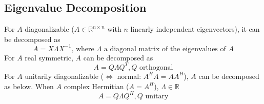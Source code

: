 \documentclass{article}
\begin{document}
\subsection{Eigenvalue Decomposition}
For $A$ diagonalizable ($A\in \mathbb{R}^{n\times n}$ with $n$ linearly independent eigenvectors), it can be decomposed as
\begin{equation*}
    A = X \Lambda X^{-1} \textrm{, where $\Lambda$ a diagonal matrix of the eigenvalues of $A$}
\end{equation*}
For $A$ real symmetric, $A$ can be decomposed as
\begin{equation*}
    A = Q\Lambda Q^T, Q \textrm{ orthogonal}
\end{equation*}
For $A$ unitarily diagonalizable ($\Leftrightarrow$ normal: $A^HA = AA^H$), $A$ can be decomposed as below. When $A$ complex Hermitian ($A = A^H$), $\Lambda \in \mathbb{R}$
\begin{equation*}
    A = Q\Lambda Q^H, Q \textrm{ unitary}
\end{equation*}


\end{document}
